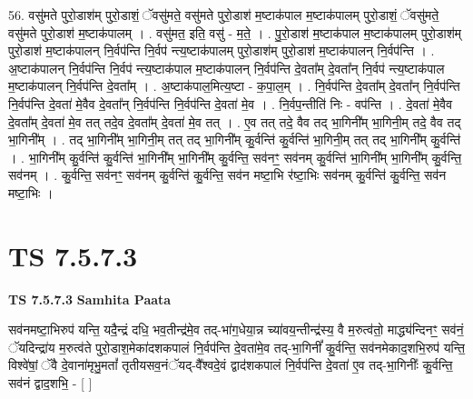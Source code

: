 \documentclass[17pt]{extarticle}
\begin{document}
56. वसु॑मते पुरो॒डाश॑म् पुरो॒डाशं॒ ॅवसु॑मते॒ वसु॑मते पुरो॒डाश॑ म॒ष्टाक॑पाल म॒ष्टाक॑पालम् पुरो॒डाशं॒ ॅवसु॑मते॒ वसु॑मते पुरो॒डाश॑ म॒ष्टाक॑पालम् । . वसु॑मत॒ इति॒ वसु॑ - म॒ते॒ । . पु॒रो॒डाश॑ म॒ष्टाक॑पाल म॒ष्टाक॑पालम् पुरो॒डाश॑म् पुरो॒डाश॑ म॒ष्टाक॑पालन् नि॒र्वप॑न्ति नि॒र्वप॑ न्त्य॒ष्टाक॑पालम् पुरो॒डाश॑म् पुरो॒डाश॑ म॒ष्टाक॑पालन् नि॒र्वप॑न्ति । . अ॒ष्टाक॑पालन् नि॒र्वप॑न्ति नि॒र्वप॑ न्त्य॒ष्टाक॑पाल म॒ष्टाक॑पालन् नि॒र्वप॑न्ति दे॒वता᳚म् दे॒वता᳚न् नि॒र्वप॑ न्त्य॒ष्टाक॑पाल म॒ष्टाक॑पालन् नि॒र्वप॑न्ति दे॒वता᳚म् । . अ॒ष्टाक॑पाल॒मित्य॒ष्टा - क॒पा॒ल॒म् । . नि॒र्वप॑न्ति दे॒वता᳚म् दे॒वता᳚न् नि॒र्वप॑न्ति नि॒र्वप॑न्ति दे॒वता॑ मे॒वैव दे॒वता᳚न् नि॒र्वप॑न्ति नि॒र्वप॑न्ति दे॒वता॑ मे॒व । . नि॒र्वप॒न्तीति॑ निः - वप॑न्ति । . दे॒वता॑ मे॒वैव दे॒वता᳚म् दे॒वता॑ मे॒व तत् तदे॒व दे॒वता᳚म् दे॒वता॑ मे॒व तत् । . ए॒व तत् तदे॒ वैव तद् भा॒गिनी᳚म् भा॒गिनी॒म् तदे॒ वैव तद् भा॒गिनी᳚म् । . तद् भा॒गिनी᳚म् भा॒गिनी॒म् तत् तद् भा॒गिनी᳚म् कु॒र्वन्ति॑ कु॒र्वन्ति॑ भा॒गिनी॒म् तत् तद् भा॒गिनी᳚म् कु॒र्वन्ति॑ । . भा॒गिनी᳚म् कु॒र्वन्ति॑ कु॒र्वन्ति॑ भा॒गिनी᳚म् भा॒गिनी᳚म् कु॒र्वन्ति॒ सव॑नꣳ॒॒ सव॑नम् कु॒र्वन्ति॑ भा॒गिनी᳚म् भा॒गिनी᳚म् कु॒र्वन्ति॒ सव॑नम् । . कु॒र्वन्ति॒ सव॑नꣳ॒॒ सव॑नम् कु॒र्वन्ति॑ कु॒र्वन्ति॒ सव॑न मष्टा॒भि र॑ष्टा॒भिः सव॑नम् कु॒र्वन्ति॑ कु॒र्वन्ति॒ सव॑न मष्टा॒भिः । \newline
\pagebreak
{}

\section{ TS 7.5.7.3 }

\textbf{TS 7.5.7.3 } \newline
\textbf{Samhita Paata} \newline

सव॑नमष्टा॒भिरुप॑ यन्ति॒ यदै॒न्द्रं दधि॒ भव॒तीन्द्र॑मे॒व तद्-भा॑ग॒धेया॒न्न च्या॑वय॒न्तीन्द्र॑स्य॒ वै म॒रुत्व॑तो॒ माद्ध्य॑न्दिनꣳ॒॒ सव॑नं॒ ॅयदिन्द्रा॑य म॒रुत्व॑ते पुरो॒डाश॒मेका॑दशकपालं नि॒र्वप॑न्ति दे॒वता॑मे॒व तद्-भा॒गिनीं᳚ कु॒र्वन्ति॒ सव॑नमेकाद॒शभि॒रुप॑ यन्ति॒ विश्वे॑षां॒ ॅवै दे॒वाना॑मृभु॒मतां᳚ तृतीयसव॒नंॅयद्-वै᳚श्वदे॒वं द्वाद॑शकपालं नि॒र्वप॑न्ति दे॒वता॑ ए॒व तद्-भा॒गिनीः᳚ कु॒र्वन्ति॒ सव॑नं द्वाद॒शभि॒ - [  ] \newline
\end{document}
